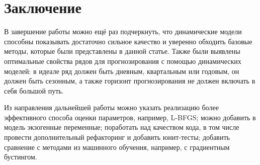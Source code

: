\documentclass[a4paper,14pt]{extarticle}
\begin{document}
\section{Заключение}
В завершение работы можно ещё раз подчеркнуть, что динамические модели способны показывать достаточно сильное качество и уверенно обходить базовые методы, которые были представлены в данной статье. Также были выявлены оптимальные свойства рядов для прогнозирования с помощью динамических моделей: в идеале ряд должен быть дневным, квартальным или годовым, он должен быть сезонным, а также горизонт прогнозирования не должен включать в себя большой путь. 

Из направления дальнейшей работы можно указать реализацию более эффективного способа оценки параметров, например, L-BFGS; можно добавить в модель экзогенные переменные; поработать над качеством кода, в том числе провести дополнительный рефакторинг и добавить юнит-тесты; добавить сравнение с методами из машинного обучения, например, с градиентным бустингом. 

\newpage 
\end{document}
